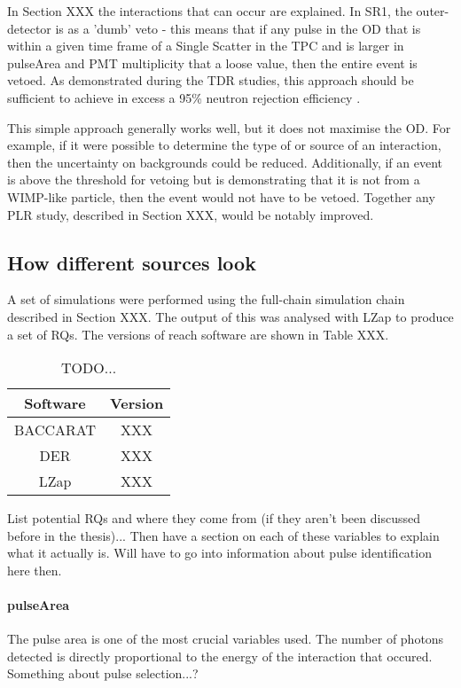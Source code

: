 \par
In Section XXX the interactions that can occur are explained.
In SR1, the outer-detector is as a 'dumb' veto - this means that if any pulse in the OD that is within a given time frame of a Single Scatter in the TPC and is larger in pulseArea and PMT multiplicity that a loose value, then the entire event is vetoed.
As demonstrated during the TDR studies, this approach should be sufficient to achieve in excess a 95\% neutron rejection efficiency \cite{LZ_TechnicalDesignReview_ref}.

\par
This simple approach generally works well, but it does not maximise the OD.
For example, if it were possible to determine the type of or source of an interaction, then the uncertainty on backgrounds could be reduced.
Additionally, if an event is above the threshold for vetoing but is demonstrating that it is not from a WIMP-like particle, then the event would not have to be vetoed.
Together any PLR study, described in Section XXX, would be notably improved.

\subsection{How different sources look}
\par
A set of simulations were performed using the full-chain simulation chain described in Section XXX.
The output of this was analysed with LZap to produce a set of RQs.
The versions of reach software are shown in Table XXX.

\begin{table}[!htbp]
    \centering
    \begin{tabular}{c|c}
        Software & Version \\ \hline
        BACCARAT & XXX\\
        DER & XXX\\
        LZap & XXX
    \end{tabular}
    \caption{TODO...}
    \label{tab:od_simulation_versions}
\end{table}


\par
List potential RQs and where they come from (if they aren't been discussed before in the thesis)...
Then have a section on each of these variables to explain what it actually is.
Will have to go into information about pulse identification here then.

\paragraph{pulseArea}
The pulse area is one of the most crucial variables used.
The number of photons detected is directly proportional to the energy of the interaction that occured.
Something about pulse selection...?

